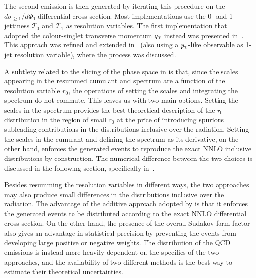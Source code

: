 \documentclass[11pt,a4paper]{article}
\begin{document}
The second emission is then generated by iterating this procedure on
the $d\sigma_{\geq 1} / d\Phi_1$ differential cross section. Most
\GENEVA{} implementations use the 0- and 1-jettiness $\mathcal{T}_0$
and $\mathcal{T}_1$ as resolution variables. The first implementation
that adopted the colour-singlet transverse momentum
$q_{\scriptscriptstyle\rm T}$ instead was presented
in~\cite{alioli:2021qbf}. This approach was refined and extended
in~\cite{Gavardi:2025zpf} (also using a $p_{\scriptscriptstyle\rm
  T}$-like observable as 1-jet resolution variable), where the \bbtoH{} process was discussed.

A subtlety related to the slicing of the phase space in \GENEVA{} is
that, since the scales appearing in the resummed cumulant and spectrum
are a function of the resolution variable $r_0$, the operations of
setting the scales and integrating the spectrum do not commute. This
leaves us with two main options. Setting the scales in the spectrum
provides the best theoretical description of the $r_0$ distribution in
the region of small $r_0$ at the price of introducing spurious
subleading contributions in the distributions inclusive over the
radiation. Setting the scales in the cumulant and defining the
spectrum as its derivative, on the other hand, enforces the generated
events to reproduce the exact NNLO inclusive distributions by
construction. The numerical difference between the two choices is discussed in the following section, specifically in~.

Besides resumming the resolution variables in different ways, the two
approaches may also produce small differences in the distributions
inclusive over the radiation. The advantage of the additive approach
adopted by \GENEVA{} is that it enforces the generated events to be
distributed according to the exact NNLO differential cross section.
On the other hand, the presence of the overall Sudakov form factor also gives \minnlo{} 
an advantage in statistical precision by
preventing the events from developing large positive or negative
weights. The distribution of the QCD emissions is instead more heavily
dependent on the specifics of the two approaches, and the availability
of two different methods is the best way to estimate their theoretical
uncertainties.
\end{document}

